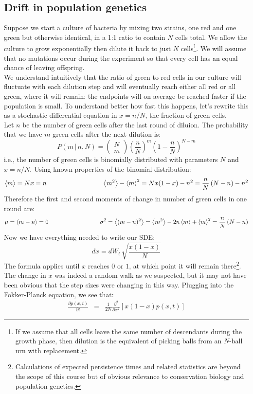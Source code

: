 \documentclass{article}
\begin{document}
\subsection*{Drift in population genetics}

Suppose we start a culture of bacteria by mixing two strains, one red and one green but otherwise identical, in a 1:1 ratio to contain $N$ cells total. We allow the culture to grow exponentially then dilute it back to just $N$ cells\footnote{If we assume that all cells leave the same number of descendants during the growth phase, then dilution is the equivalent of picking balls from an $N$-ball urn with replacement.}. We will assume that no mutations occur during the experiment so that every cell has an equal chance of leaving offspring.\\

We understand intuitively that the ratio of green to red cells in our culture will fluctuate with each dilution step and will eventually reach either all red or all green, where it will remain: the endpoints will on average be reached faster if the population is small. To understand better how fast this happens, let's rewrite this as a stochastic differential equation in $x=n/N$, the fraction of green cells.\\

Let $n$ be the number of green cells after the last round of diluion. The probability that we have $m$ green cells after the next dilution is:
\[ P(m \, | \, n, N) = \begin{pmatrix} N \\ m \end{pmatrix} \left(\frac{n}{N} \right)^m \left(1 - \frac{n}{N} \right)^{N-m} \]
i.e., the number of green cells is binomially distributed with parameters $N$ and $x=n/N$. Using known properties of the binomial distribution:
\[ \left< m \right> = Nx = n \hspace{ 3 cm} \left< m^2 \right> -\left< m \right>^2 = Nx(1-x) - n^2= \frac{n}{N} \left( N - n \right) - n^2 \]
Therefore the first and second moments of change in number of green cells in one round are:
\[ \mu = \left< m - n \right> = 0 \hspace{ 3 cm} \sigma^2 = \left< (m - n)^2 \right> = \left< m^2 \right> - 2 n \left< m \right> + \left< m \right>^2 = \frac{n}{N} \left( N - n \right) \]
Now we have everything needed to write our SDE:
\[ dx =dW_t \, \sqrt{\frac{x(1-x)}{N}} \]
The formula applies until $x$ reaches $0$ or $1$, at which point it will remain there\footnote{Calculations of expected persistence times and related statistics are beyond the scope of this course but of obvious relevance to conservation biology and population genetics.}. The change in $x$ was indeed a random walk as we suspected, but it may not have been obvious that the step sizes were changing in this way. Plugging into the Fokker-Planck equation, we see that:
\begin{eqnarray*}
\frac{\partial p(x,t)}{\partial t} & = &  \frac{1}{2N} \frac{\partial^2}{\partial x^2} \left[ x(1-x) p(x,t) \right]
\end{eqnarray*}
 
\end{document}

